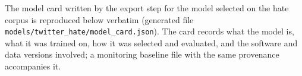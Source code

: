 The model card written by the export step for the model selected on the hate corpus is reproduced below verbatim (generated file \texttt{models/twitter\_hate/model\_card.json}). The card records what the model is, what it was trained on, how it was selected and evaluated, and the software and data versions involved; a monitoring baseline file with the same provenance accompanies it.


